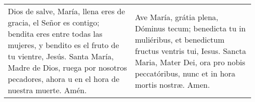 \documentclass[../devocionario.tex]{subfiles}
\begin{document}
    \begin{longtable} { p{} p{} }
        Dios de salve, María, llena eres de gracia, el Señor es contigo; bendita eres entre todas las mujeres, 
        y bendito es el fruto de tu vientre, Jesús. Santa María, Madre de Dios, ruega por nosotros pecadores, 
        ahora u en el hora de nuestra muerte. Amén.
        
        &
        
        Ave María, grátia plena, Dóminus tecum; benedicta tu in muliéribus, et benedictum fructus ventris tui, 
        Iesus. Sancta Maria, Mater Dei, ora pro nobis peccatóribus, nunc et in hora mortis nostræ. Amen.
    \end{longtable}
\end{document}

